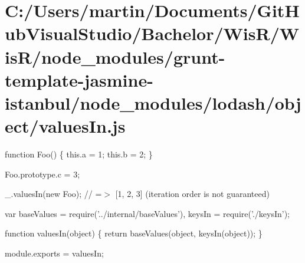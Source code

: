 \hypertarget{_c_1_2_users_2martin_2_documents_2_git_hub_visual_studio_2_bachelor_2_wis_r_2_wis_r_2node_module13d3ad60a02a55538f47edbf79904433}{}\section{C\+:/\+Users/martin/\+Documents/\+Git\+Hub\+Visual\+Studio/\+Bachelor/\+Wis\+R/\+Wis\+R/node\+\_\+modules/grunt-\/template-\/jasmine-\/istanbul/node\+\_\+modules/lodash/object/values\+In.\+js}
function Foo() \{ this.\+a = 1; this.\+b = 2; \}

Foo.\+prototype.\+c = 3;

\+\_\+.\+values\+In(new Foo); // =$>$ \mbox{[}1, 2, 3\mbox{]} (iteration order is not guaranteed)


\begin{DoxyCodeInclude}
var baseValues = require(\textcolor{stringliteral}{'../internal/baseValues'}),
    keysIn = require(\textcolor{stringliteral}{'./keysIn'});

\textcolor{keyword}{function} valuesIn(\textcolor{keywordtype}{object}) \{
  \textcolor{keywordflow}{return} baseValues(\textcolor{keywordtype}{object}, keysIn(\textcolor{keywordtype}{object}));
\}

module.exports = valuesIn;
\end{DoxyCodeInclude}
 